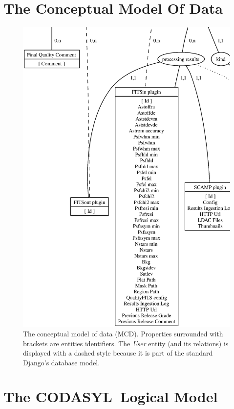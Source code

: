 \documentclass[twoside,a4paper]{article}
\def \codasyl {{\sc CODASYL\ }}
\begin{document}
\section{The Conceptual Model Of Data}
\begin{figure}[h!]
\centering
\includegraphics[totalheight=1.07\textheight]{mcd}
\caption[The Conceptual Model of Data]{The conceptual model of data (MCD). Properties surrounded with brackets are entities identifiers. The \emph{User}  entity (and its relations) is displayed with a dashed style because it is part of the standard Django's database model.}
\label{fig:mcd}
\end{figure}

\section{The \codasyl Logical Model}
\end{document}
